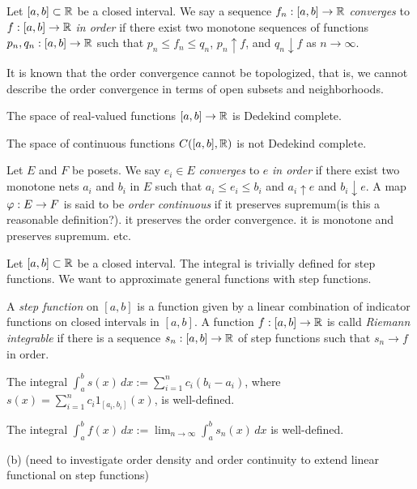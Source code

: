 \documentclass{../../large}
\begin{document}
\begin{prb}
Let $[a,b]\subset\mathbb{R}$ be a closed interval.
We say a sequence $f_n:[a,b]\to\mathbb{R}$ \emph{converges} to $f:[a,b]\to\mathbb{R}$ \emph{in order} if there exist two monotone sequences of functions $p_n,q_n:[a,b]\to\mathbb{R}$ such that $p_n\le f_n\le q_n$, $p_n\uparrow f$, and $q_n\downarrow f$ as $n\to\infty$.

It is known that the order convergence cannot be topologized, that is, we cannot describe the order convergence in terms of open subsets and neighborhoods.
\begin{parts}
\item The space of real-valued functions $[a,b]\to\mathbb{R}$ is Dedekind complete.
\item The space of continuous functions $C([a,b],\mathbb{R})$ is not Dedekind complete.
\end{parts}
\end{prb}

\begin{prb}
Let $E$ and $F$ be posets.
We say $e_i\in E$ \emph{converges} to $e$ \emph{in order} if there exist two monotone nets $a_i$ and $b_i$ in $E$ such that $a_i\le e_i\le b_i$ and $a_i\uparrow e$ and $b_i\downarrow e$.
A map $\varphi:E\to F$ is said to be \emph{order continuous} if it preserves supremum(is this a reasonable definition?). it preserves the order convergence. it is monotone and preserves supremum. etc.
\end{prb}

\begin{prb}
Let $[a,b]\subset\mathbb{R}$ be a closed interval.
The integral is trivially defined for step functions.
We want to approximate general functions with step functions.

A \emph{step function} on $[a,b]$ is a function given by a linear combination of indicator functions on closed intervals in $[a,b]$.
A function $f:[a,b]\to\mathbb{R}$ is calld \emph{Riemann integrable} if there is a sequence $s_n:[a,b]\to\mathbb{R}$ of step functions such that $s_n\to f$ in order.
\begin{parts}
\item The integral $\int_a^bs(x)\,dx:=\sum_{i=1}^nc_i(b_i-a_i)$, where $s(x)=\sum_{i=1}^nc_i1_{[a_i,b_i]}(x)$, is well-defined.
\item The integral $\int_a^bf(x)\,dx:=\lim_{n\to\infty}\int_a^bs_n(x)\,dx$ is well-defined.
\end{parts}
\end{prb}
\begin{pf}
(b)
(need to investigate order density and order continuity to extend linear functional on step functions)
\end{pf}
\end{document}

